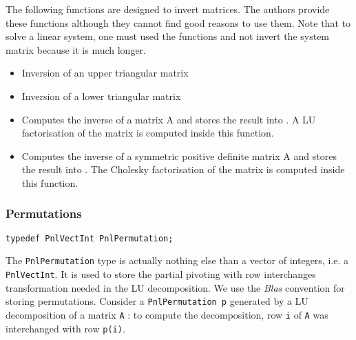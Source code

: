 The following functions are designed to invert matrices. The authors provide
these functions although they cannot find good reasons to use them. Note that
to solve a linear system, one must used the  functions and not
invert the system matrix because it is much longer.
\begin{itemize}
\item {}
  \sshortdescribe Inversion of an upper triangular matrix  

\item {}
  \sshortdescribe Inversion of a lower triangular matrix  

\item {}
  \sshortdescribe Computes the inverse of a matrix A and stores the result
  into . A LU factorisation of the matrix  is computed
  inside this function.
\item {}
  \sshortdescribe Computes the inverse of a symmetric positive definite matrix
  A and stores the result into . The Cholesky factorisation of
  the matrix  is computed inside this function.
\end{itemize}

\subsubsection{Permutations}

\begin{verbatim}
typedef PnlVectInt PnlPermutation;
\end{verbatim}

The \verb!PnlPermutation! type is actually nothing else than a vector of
integers, i.e. a \verb!PnlVectInt!. It is used to store the partial pivoting
with row interchanges transformation needed in the LU decomposition.  We use the
{\it Blas} convention for storing permutations. Consider a \verb!PnlPermutation p!
generated by a LU decomposition of a matrix \verb!A! : to compute the
decomposition, row \verb!i! of \verb!A! was interchanged with row \verb!p(i)!.



